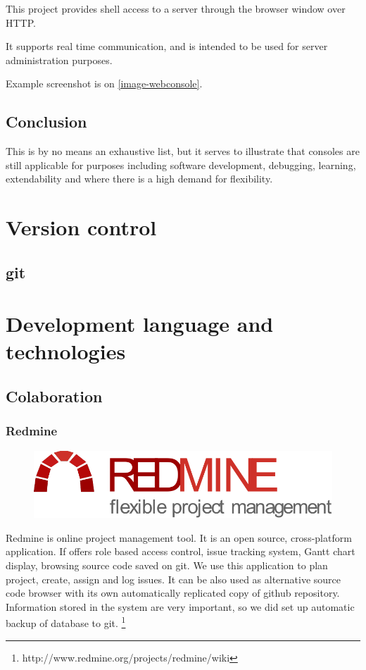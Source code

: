 This project provides shell access to a server through the browser window over HTTP.

It supports real time communication, and is intended to be used for server administration purposes.

Example screenshot is on \ref{image-webconsole}.

\subsection{Conclusion}

This is by no means an exhaustive list, but it serves to illustrate that consoles are still applicable for purposes including software development, debugging, learning, extendability and where there is a high demand for flexibility.



\section{Version control}
\subsection{git}

\section{Development language and technologies}
\subsection{Colaboration}

\subsubsection{Redmine}

\begin{figure}
\vspace{-30pt}
\centering
\includegraphics[width = .30\textwidth]{image/redmine-logo.pdf}
\end{figure}

Redmine is online project management tool. It is an open source, cross-platform application. If offers role based access control, issue tracking system, Gantt chart display, browsing source code saved on git. We use this application to plan project, create, assign and log issues. It can be also used as alternative source code browser with its own automatically replicated copy of github repository. Information stored in the system are very important, so we did set up automatic backup of database to git.
\footnote{http://www.redmine.org/projects/redmine/wiki}

